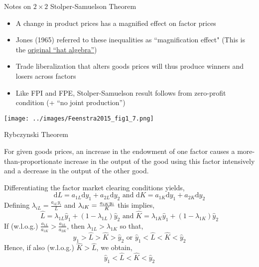 \documentclass[10pt,notes=hide]{beamer}
\begin{document}
\begin{frame}{Notes on $2 \times 2$ Stolper-Samuelson Theorem}
\begin{itemize}
\item A change in product prices has a magnified effect on factor
prices
\item Jones (1965) referred to these inequalities as ``magnification
effect"
(This is the \href{https://tradediversion.net/2018/05/07/on-hat-algebra/}{original ``hat algebra''})
\item Trade liberalization that alters goods prices will thus produce winners and losers across factors
\item Like FPI and FPE, Stolper-Samuelson result follows from zero-profit condition (+ ``no joint production'')
\end{itemize}
\begin{center}
\texttt{[image: ../images/Feenstra2015\_fig1\_7.png]}
\end{center}
\end{frame}
\begin{frame}{Rybczynski Theorem}
\begin{theorem}
For given goods prices, an increase in the endowment of one factor
causes a more-than-proportionate increase in the output of the good using this factor intensively and
a decrease in the output of the other good.
\end{theorem}
Differentiating the factor market clearing conditions yields,%
\begin{equation*}
\textrm{d}L=a_{1L}\textrm{d}y_{1}+a_{2L}\textrm{d}y_{2}\text{ and\ }\textrm{d}K=a_{1K}\textrm{d}y_{1}+a_{2K}\textrm{d}y_{2}
\end{equation*}
Defining $\lambda _{iL}=\frac{a_{iL}y_{i}}{L}$ and $\lambda _{iK}=\frac{%
a_{iK}y_{i}}{K}$ this implies,%
\begin{equation*}
\hat{L}=\lambda _{1L}\hat{y}_{1}+\left( 1-\lambda _{1L}\right) \hat{y}_{2}%
\text{ and }\hat{K}=\lambda _{1K}\hat{y}_{1}+\left( 1-\lambda _{1K}\right) 
\hat{y}_{2}
\end{equation*}
If (w.l.o.g.) $\frac{a_{1L}}{a_{1K}}>\frac{a_{2L}}{a_{2K}}$, then $\lambda
_{1L}>\lambda _{1K}$ so that,%
\begin{equation*}
\hat{y}_{1}>\hat{L}>\hat{K}>\hat{y}_{2}\text{ or }\hat{y}_{1}<\hat{L}<\hat{K}%
<\hat{y}_{2}
\end{equation*}
Hence, if also (w.l.o.g.) $\hat{K}>\hat{L}$, we obtain,%
\begin{equation*}
\hat{y}_{1}<\hat{L}<\hat{K}<\hat{y}_{2}
\end{equation*}
\end{frame}
\end{document}
